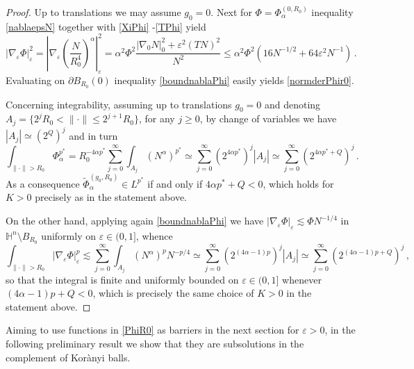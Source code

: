 \documentclass[10pt]{amsart}
\numberwithin{equation}{section}
\theoremstyle{definition}
\newcommand{\He}{\mathbb{H}}
\begin{document}
\begin{proof}
Up to translations we may assume $g_0=0$. Next for $\Phi=\Phi^{(0, R_0)}_{\alpha}$  inequality \eqref{nablaepsN} together with \eqref{XiPhi} -\eqref{TPhi} yield
\begin{equation}
\label{boundnablaPhi} | \nabla_\varepsilon \Phi |_\varepsilon^2= \left|\nabla_\varepsilon \left( \frac{N}{R_0^4}\right)^\alpha\right|_\varepsilon^2=\alpha^2 \Phi^2 \frac{|\nabla_0 N|_0^2+\varepsilon^2 (TN)^2
}{N^2} \leq \alpha^2 \Phi^2 (16N^{-1/2} + 64 \varepsilon^2 N^{-1}) \, .
\end{equation}
Evaluating on $\partial B_{R_0}(0)$ inequality \eqref{boundnablaPhi} easily yields \eqref{normderPhir0}. 

Concerning integrability, assuming up to translations $g_0=0$ and denoting $A_j= \{ 2^j R_0 <\| \cdot\| \leq 2^{j+1} R_0 \}$, for any $j \geq 0$, by change of variables we have  $| A_j | \simeq (2^Q)^j$ and in turn
\[ \int_{\| \cdot\| >R_0} \Phi_\alpha^{p^*}  = R_0^{-4\alpha p^*} \sum_{j=0}^\infty \int_{A_j} \left(N^{\alpha}\right)^{p^*}\simeq \sum_{j=0}^\infty (2^{4\alpha p^*})^j |A_j| \simeq \sum_{j=0}^\infty (2^{4\alpha p^*+Q})^j   \, .\]
As a consequence $\tilde{\Phi}^{(g_0, R_0)}_{\alpha} \in L^{p^*}$ if and only if $4\alpha p^*+Q<0$, which holds for $K>0$ precisely as in the statement above.

On the other hand, applying again \eqref{boundnablaPhi} we have $| \nabla_\varepsilon \Phi |_\varepsilon \lesssim \Phi N^{-1/4}$ in $\He^n\setminus B_{R_0}$ uniformly on $\varepsilon \in (0,1]$, whence  
\[ \int_{\| \cdot\| >R_0} | \nabla_\varepsilon \Phi |_\varepsilon^p  \lesssim  \sum_{j=0}^\infty \int_{A_j} \left(N^{\alpha}\right)^{p} N^{-p/4}\simeq \sum_{j=0}^\infty (2^{(4\alpha-1) p})^j |A_j| \simeq \sum_{j=0}^\infty (2^{(4\alpha-1) p+Q})^j   \,  ,\]
so that the integral is finite and uniformly bounded on $\varepsilon \in (0,1]$ whenever $(4\alpha-1) p+Q<0$, which is precisely the same choice of $K>0$ in the statement above.
\end{proof}
Aiming to use functions in \eqref{PhiR0} as barriers in the next section for $\varepsilon>0$, in the following preliminary result we show that they are subsolutions in the complement of Kor\`anyi balls.
\end{document}
